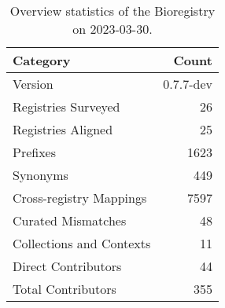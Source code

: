 \begin{table}
\centering
\caption{Overview statistics of the Bioregistry on 2023-03-30.}
\label{tab:bioregistry-summary}
\begin{tabular}{lr}
\toprule
                Category &     Count \\
\midrule
                 Version & 0.7.7-dev \\
     Registries Surveyed &        26 \\
      Registries Aligned &        25 \\
                Prefixes &      1623 \\
                Synonyms &       449 \\
 Cross-registry Mappings &      7597 \\
      Curated Mismatches &        48 \\
Collections and Contexts &        11 \\
     Direct Contributors &        44 \\
      Total Contributors &       355 \\
\bottomrule
\end{tabular}
\end{table}

